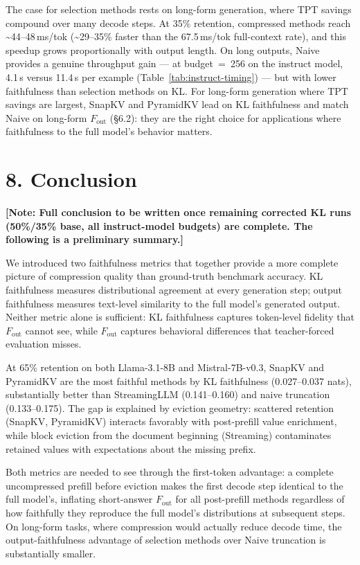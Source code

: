 \documentclass[10pt,letterpaper]{article}
\begin{document}
The case for selection methods rests on long-form generation, where TPT savings
compound over many decode steps. At 35\% retention, compressed methods reach
\textasciitilde44--48\,ms/tok (\textasciitilde29--35\% faster than the
67.5\,ms/tok full-context rate), and this speedup grows proportionally with output
length. On long outputs, Naive provides a genuine throughput gain --- at
budget~=~256 on the instruct model, 4.1\,s versus 11.4\,s per example
(Table~\ref{tab:instruct-timing}) --- but with lower faithfulness than selection
methods on KL. For long-form generation where TPT savings are largest, SnapKV and
PyramidKV lead on KL faithfulness and match Naive on long-form \(F_{\text{out}}\)
(§6.2): they are the right choice for applications where faithfulness to the full
model's behavior matters.

\hypertarget{conclusion}{%
\section{8. Conclusion}\label{conclusion}}

\textbf{[Note: Full conclusion to be written once remaining corrected
KL runs (50\%/35\% base, all instruct-model budgets) are complete.
The following is a preliminary summary.]}

We introduced two faithfulness metrics that together provide a more
complete picture of compression quality than ground-truth benchmark accuracy.
KL faithfulness measures distributional agreement at every generation step;
output faithfulness measures text-level similarity to the full model's
generated output. Neither metric alone is sufficient: KL faithfulness
captures token-level fidelity that \(F_{\text{out}}\) cannot see, while
\(F_{\text{out}}\) captures behavioral differences that teacher-forced
evaluation misses.

At 65\% retention on both Llama-3.1-8B and Mistral-7B-v0.3, SnapKV and
PyramidKV are the most faithful methods by KL faithfulness (0.027--0.037 nats),
substantially better than StreamingLLM (0.141--0.160) and naive truncation
(0.133--0.175). The gap is explained by eviction geometry: scattered retention
(SnapKV, PyramidKV) interacts favorably with post-prefill value enrichment,
while block eviction from the document beginning (Streaming) contaminates
retained values with expectations about the missing prefix.

Both metrics are needed to see through the first-token advantage: a complete
uncompressed prefill before eviction makes the first decode step identical to
the full model's, inflating short-answer \(F_{\text{out}}\) for all
post-prefill methods regardless of how faithfully they reproduce the full
model's distributions at subsequent steps. On long-form tasks, where
compression would actually reduce decode time, the output-faithfulness
advantage of selection methods over Naive truncation is substantially smaller.
\end{document}
